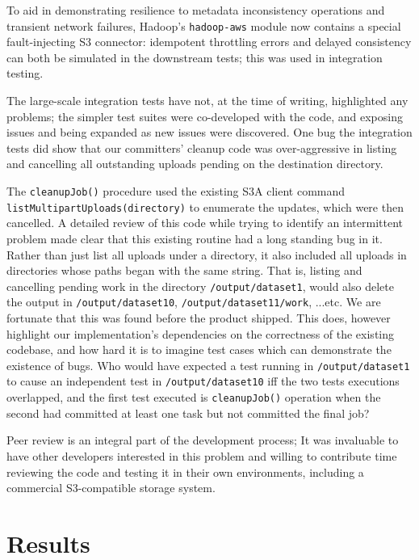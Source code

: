 \documentclass[conference]{IEEEtran}
\begin{document}
To aid in demonstrating resilience to metadata inconsistency
operations and transient network failures, Hadoop's \texttt{hadoop-aws} module
now contains a special fault-injecting S3 connector: idempotent throttling errors and
delayed consistency can both be simulated in the downstream tests;
this was used in integration testing.

The large-scale integration tests have not, at the time of writing, highlighted any problems;
the simpler test suites were co-developed with the code, and exposing issues and
being expanded as new issues were discovered.
One bug the integration tests did show that our committers' cleanup code was
over-aggressive in listing and cancelling all outstanding uploads pending
on the destination directory.


The \texttt{cleanupJob()} procedure used the existing S3A client command
\texttt{listMultipartUploads(directory)} to enumerate the updates,
which were then cancelled.
A detailed review of this code while trying to identify an intermittent problem
made clear that this existing routine had a long standing bug in it.
Rather than just list all uploads under a directory, it also included
all uploads in directories whose paths began with the same string.
That is, listing and cancelling pending work in the directory \texttt{/output/dataset1},
would also delete the output in \texttt{/output/dataset10}, \texttt{/output/dataset11/work},
...etc.
We are fortunate that this was found before the product shipped.
This does, however highlight our implementation's dependencies on the correctness
of the existing codebase, and how hard it is to imagine test cases which
can demonstrate the existence of bugs.
Who would have expected a test running in \texttt{/output/dataset1} to
cause an independent test in \texttt{/output/dataset10} iff the two tests
executions overlapped, and the first test executed is \texttt{cleanupJob()}
operation when the second had committed at least one task but not committed
the final job?


Peer review is an integral part of the development process;
It was invaluable to have other developers interested in this problem
and willing to contribute time reviewing the code and testing it
in their own environments, including a commercial S3-compatible
storage system.



\section{Results}
\label{sec:results}
\end{document}
